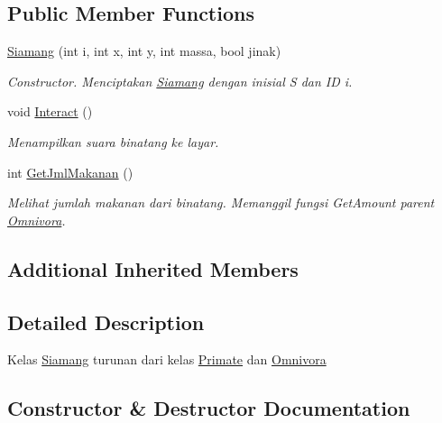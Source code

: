 \subsection*{Public Member Functions}
\begin{DoxyCompactItemize}
\item 
\hyperlink{classSiamang_a57da4cc19d81240e9e494e631ea7d0ba}{Siamang} (int i, int x, int y, int massa, bool jinak)
\begin{DoxyCompactList}\small\item\em Constructor. Menciptakan \hyperlink{classSiamang}{Siamang} dengan inisial \textquotesingle{}S\textquotesingle{} dan ID i. \end{DoxyCompactList}\item 
void \hyperlink{classSiamang_ac38a3558bedab8281fcbc03316c22b4f}{Interact} ()\hypertarget{classSiamang_ac38a3558bedab8281fcbc03316c22b4f}{}\label{classSiamang_ac38a3558bedab8281fcbc03316c22b4f}

\begin{DoxyCompactList}\small\item\em Menampilkan suara binatang ke layar. \end{DoxyCompactList}\item 
int \hyperlink{classSiamang_af604ba0243bb13132d2b5ac191f41839}{Get\+Jml\+Makanan} ()
\begin{DoxyCompactList}\small\item\em Melihat jumlah makanan dari binatang. Memanggil fungsi Get\+Amount parent \hyperlink{classOmnivora}{Omnivora}. \end{DoxyCompactList}\end{DoxyCompactItemize}
\subsection*{Additional Inherited Members}


\subsection{Detailed Description}
Kelas \hyperlink{classSiamang}{Siamang} turunan dari kelas \hyperlink{classPrimate}{Primate} dan \hyperlink{classOmnivora}{Omnivora} 

\subsection{Constructor \& Destructor Documentation}
